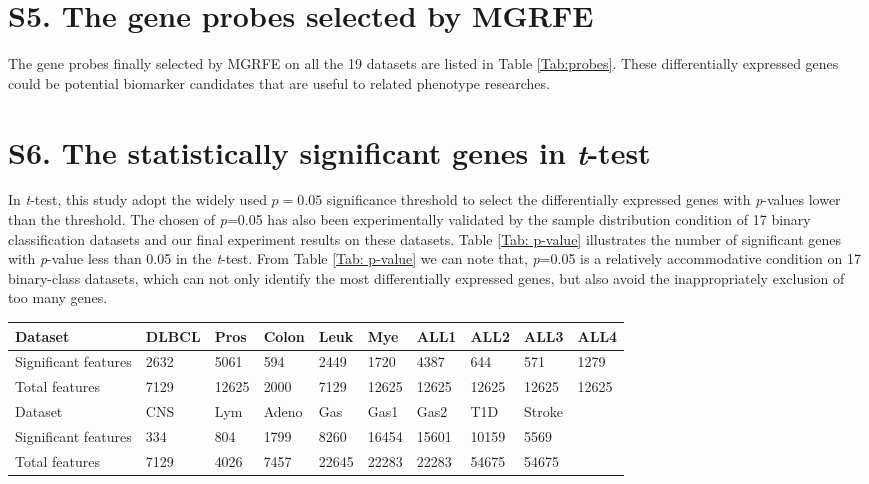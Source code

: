 \documentclass[10pt,journal,compsoc]{IEEEtran}
\begin{document}
	\section*{S5. The gene probes selected by MGRFE}

	The gene probes finally selected by MGRFE on all the 19 datasets are listed in Table \ref{Tab:probes}. These differentially expressed genes could be potential biomarker candidates that are useful to related phenotype researches.


	\section*{S6. The statistically significant genes in \emph{t}-test}

	In \emph{t}-test, this study adopt the widely used $p = 0.05$ significance threshold to select the differentially expressed genes with \emph{p}-values lower than the threshold.
	The chosen of \emph{p}=0.05 has also been experimentally validated by the sample distribution condition of 17 binary classification datasets and our final experiment results on these datasets. Table \ref{Tab: p-value} illustrates the number of significant genes with \emph{p}-value less than 0.05 in the \emph{t}-test. From Table \ref{Tab: p-value} we can note that, \emph{p}=0.05 is a relatively accommodative condition on 17 binary-class datasets, which can not only identify the most differentially expressed genes, but also avoid the inappropriately exclusion of too many genes.

	\begin{table*}[htbp]
	\centering
	\caption{Number of statistically significant features with \emph{t}-test-based \emph{p}-values less than 0.05 on 17 binary classification datasets.}
	\label{Tab: p-value}
		\begin{tabular}{l|lllllllll}
			\toprule
			Dataset & DLBCL & Pros & Colon & Leuk & Mye & ALL1 & ALL2 & ALL3 & ALL4\\
			\hline
			Significant features & 2632 & 5061 & 594 & 2449 & 1720 & 4387 & 644 & 571 & 1279\\
			Total features & 7129 & 12625 & 2000 & 7129 & 12625 & 12625 & 12625 & 12625 & 12625\\
			\midrule
			Dataset & CNS & Lym & Adeno & Gas & Gas1 & Gas2 & T1D & Stroke &\\
			\hline
			Significant features & 334 & 804 & 1799 & 8260 & 16454 & 15601 & 10159 & 5569 &\\
			Total features & 7129 & 4026 & 7457 & 22645 & 22283 & 22283 & 54675 & 54675 & \\
			\bottomrule
		\end{tabular}
	\end{table*}
\end{document}
